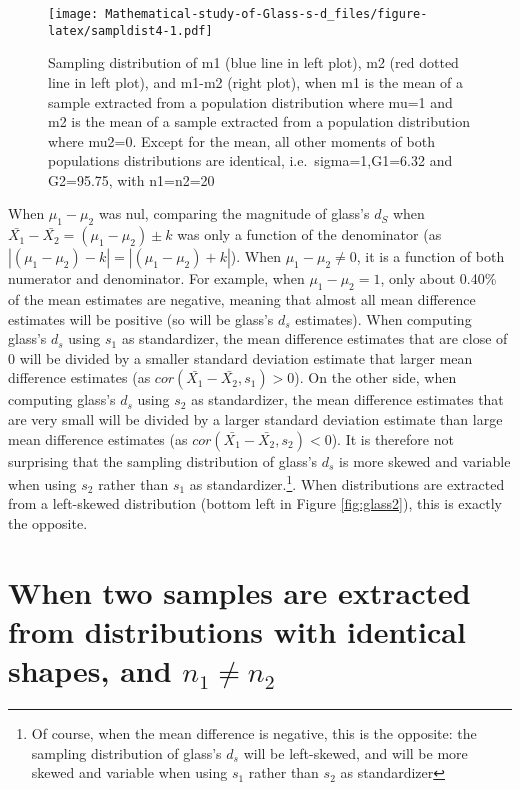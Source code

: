 \documentclass[
  man,floatsintext]{apa6}
\begin{document}
\begin{figure}
\centering
\texttt{[image: Mathematical-study-of-Glass-s-d\_files/figure-latex/sampldist4-1.pdf]}
\caption{\label{fig:sampldist4}Sampling distribution of m1 (blue line in left plot), m2 (red dotted line in left plot), and m1-m2 (right plot), when m1 is the mean of a sample extracted from a population distribution where mu=1 and m2 is the mean of a sample extracted from a population distribution where mu2=0. Except for the mean, all other moments of both populations distributions are identical, i.e.~sigma=1,G1=6.32 and G2=95.75, with n1=n2=20}
\end{figure}

When \(\mu_1-\mu_2\) was nul, comparing the magnitude of glass's \(d_S\) when \(\bar{X_1}-\bar{X_2} = (\mu_1-\mu_2) \pm k\) was only a function of the denominator (as \(|(\mu_1-\mu_2)-k|=|(\mu_1-\mu_2)+k|\)). When \(\mu_1-\mu_2 \neq 0\), it is a function of both numerator and denominator. For example, when \(\mu_1-\mu_2=1\), only about 0.40\% of the mean estimates are negative, meaning that almost all mean difference estimates will be positive (so will be glass's \(d_s\) estimates). When computing glass's \(d_s\) using \(s_1\) as standardizer, the mean difference estimates that are close of 0 will be divided by a smaller standard deviation estimate that larger mean difference estimates (as \(cor(\bar{X_1}-\bar{X_2},s_1)>0\)). On the other side, when computing glass's \(d_s\) using \(s_2\) as standardizer, the mean difference estimates that are very small will be divided by a larger standard deviation estimate than large mean difference estimates (as \(cor(\bar{X_1}-\bar{X_2},s_2)<0\)). It is therefore not surprising that the sampling distribution of glass's \(d_s\) is more skewed and variable when using \(s_2\) rather than \(s_1\) as standardizer.\footnote{Of course, when the mean difference is negative, this is the opposite: the sampling distribution of glass's $d_s$ will be left-skewed, and will be more skewed and variable when using $s_1$ rather than $s_2$ as standardizer}. When distributions are extracted from a left-skewed distribution (bottom left in Figure \ref{fig:glass2}), this is exactly the opposite.

\hypertarget{when-two-samples-are-extracted-from-distributions-with-identical-shapes-and-n_1-neq-n_2}{%
\section{\texorpdfstring{When two samples are extracted from distributions with identical shapes, and \(n_1 \neq n_2\)}{When two samples are extracted from distributions with identical shapes, and n\_1 \textbackslash neq n\_2}}\label{when-two-samples-are-extracted-from-distributions-with-identical-shapes-and-n_1-neq-n_2}}
\end{document}
